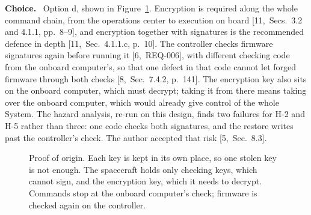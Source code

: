 \documentclass[11pt,a4paper]{article}
\newcommand{\nohyph}{\hyphenpenalty=10000\exhyphenpenalty=10000\relax}
\newcommand{\field}[1]{\par\needspace{4\baselineskip}\smallskip\noindent\textbf{#1.}~}
\begin{document}
\field{Choice} Option d, shown in Figure~\ref{fig:origin}.
Encryption is required along the whole command chain, from the operations
center to execution on board [11,~Secs.~3.2 and 4.1.1, pp.~8--9], and
encryption together with signatures is the recommended defence in depth
[11,~Sec.~4.1.1.c, p.~10]. The controller checks firmware signatures again
before running it [6,~REQ-006], with different checking code from the onboard
computer's, so that one defect in that code cannot let forged firmware through
both checks [8,~Sec.~7.4.2, p.~141]. The encryption key also sits on the
onboard computer, which must decrypt; taking it from there means taking over
the onboard computer, which would already give control of the whole System.
The hazard analysis, re-run on this design, finds two failures for H-2 and H-5
rather than three: one code checks both signatures, and the restore writes
past the controller's check. The author accepted that risk [5,~Sec.~8.3].

\begin{figure}[H]
\centering
{}
\caption{Proof of origin. Each key is kept in its own place, so one stolen key
is not enough. The spacecraft holds only checking keys, which cannot sign, and
the encryption key, which it needs to decrypt. Commands stop at the onboard
computer's check; firmware is checked again on the controller.}
\label{fig:origin}
\end{figure}
\end{document}

